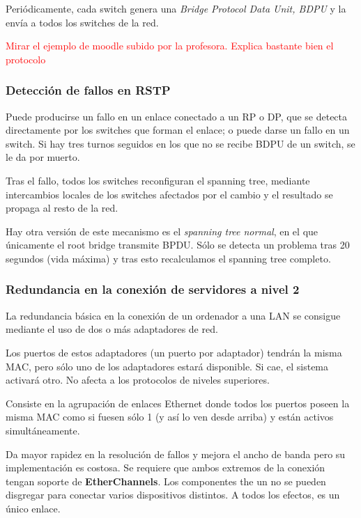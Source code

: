 Periódicamente, cada switch genera una \textit{Bridge Protocol Data Unit, BDPU} y la envía a todos los switches de la red.

\textcolor{red}{Mirar el ejemplo de moodle subido por la profesora. Explica bastante bien el protocolo}

\subsubsection{Detección de fallos en RSTP}
Puede producirse un fallo en un enlace conectado a un RP o DP, que se detecta directamente por los switches que forman el enlace; o puede darse un fallo en un switch. Si hay tres turnos seguidos en los que no se recibe BDPU de un switch, se le da por muerto.

Tras el fallo, todos los switches reconfiguran el spanning tree, mediante intercambios locales de los switches afectados por el cambio y el resultado se propaga al resto de la red.

\obs Hay otra versión de este mecanismo es el \textit{spanning tree normal}, en el que únicamente el root bridge transmite BPDU. Sólo se detecta un problema tras 20 segundos (vida máxima) y tras esto recalculamos el spanning tree completo.

\subsubsection{Redundancia en la conexión de servidores a nivel 2}
La redundancia básica en la conexión de un ordenador a una LAN se consigue mediante el uso de dos o más adaptadores de red.

Los puertos de estos adaptadores (un puerto por adaptador) tendrán la misma MAC, pero sólo uno de los adaptadores estará disponible. Si cae, el sistema activará otro. No afecta a los protocolos de niveles superiores.

\begin{defn}[EtherChannels]
Consiste en la agrupación de enlaces Ethernet donde todos los puertos poseen la misma MAC como si fuesen sólo 1 (y así lo ven desde arriba) y están activos simultáneamente.

Da mayor rapidez en la resolución de fallos y mejora el ancho de banda pero su implementación es costosa. Se requiere que ambos extremos de la conexión tengan soporte de \textbf{EtherChannels}. Los componentes the un  no se pueden disgregar para conectar varios dispositivos distintos. A todos los efectos, es un único enlace.

\end{defn}

